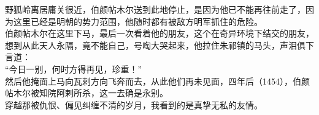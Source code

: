 \begin{multicols}{\theparacolNo}
野狐岭离居庸关很近，伯颜帖木尔送到此地停止，是因为他已不能再往前走了，因为这里已经是明朝的势力范围，他随时都有被敌方明军抓住的危险。\\

伯颜帖木尔在这里下马，最后一次看着他的朋友，这个在奇异环境下结交的朋友，想到从此天人永隔，竟不能自己，号啕大哭起来，他拉住朱祁镇的马头，声泪俱下言道：\\

“今日一别，何时方得再见，珍重！”\\

然后他掩面上马向瓦剌方向飞奔而去，从此他们再未见面，四年后（1454），伯颜帖木尔被知院阿剌所杀，这一去确是永别。\\

穿越那被仇恨、偏见纠缠不清的岁月，我看到的是真挚无私的友情。\\
\ifnum{}
	\end{multicols}
\fi
\newpage
